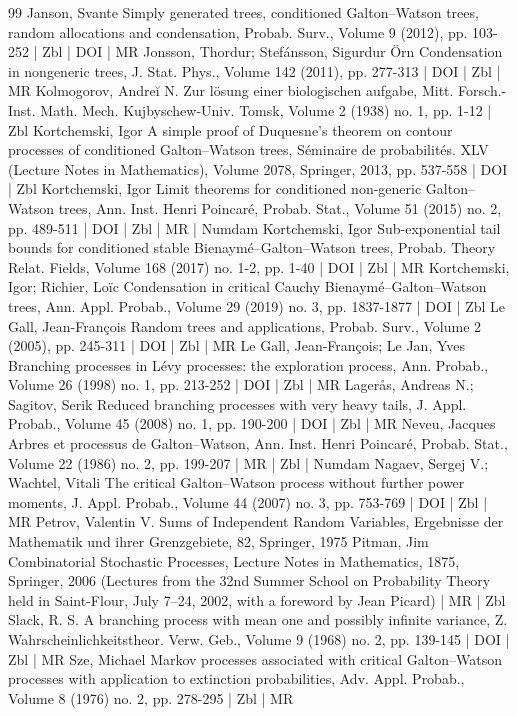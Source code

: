 \begin{thebibliography}{99}
Janson, Svante Simply generated trees, conditioned Galton–Watson trees, random allocations and condensation, Probab. Surv., Volume 9 (2012), pp. 103-252 | Zbl | DOI | MR
Jonsson, Thordur; Stefánsson, Sigurdur Örn Condensation in nongeneric trees, J. Stat. Phys., Volume 142 (2011), pp. 277-313 | DOI | Zbl | MR
Kolmogorov, Andreĭ N. Zur lösung einer biologischen aufgabe, Mitt. Forsch.-Inst. Math. Mech. Kujbyschew-Univ. Tomsk, Volume 2 (1938) no. 1, pp. 1-12 | Zbl
Kortchemski, Igor A simple proof of Duquesne’s theorem on contour processes of conditioned Galton–Watson trees, Séminaire de probabilités. XLV (Lecture Notes in Mathematics), Volume 2078, Springer, 2013, pp. 537-558 | DOI | Zbl
Kortchemski, Igor Limit theorems for conditioned non-generic Galton–Watson trees, Ann. Inst. Henri Poincaré, Probab. Stat., Volume 51 (2015) no. 2, pp. 489-511 | DOI | Zbl | MR | Numdam
Kortchemski, Igor Sub-exponential tail bounds for conditioned stable Bienaymé–Galton–Watson trees, Probab. Theory Relat. Fields, Volume 168 (2017) no. 1-2, pp. 1-40 | DOI | Zbl | MR
Kortchemski, Igor; Richier, Loïc Condensation in critical Cauchy Bienaymé–Galton–Watson trees, Ann. Appl. Probab., Volume 29 (2019) no. 3, pp. 1837-1877 | DOI | Zbl
Le Gall, Jean-François Random trees and applications, Probab. Surv., Volume 2 (2005), pp. 245-311 | DOI | Zbl | MR
Le Gall, Jean-François; Le Jan, Yves Branching processes in Lévy processes: the exploration process, Ann. Probab., Volume 26 (1998) no. 1, pp. 213-252 | DOI | Zbl | MR
Lagerås, Andreas N.; Sagitov, Serik Reduced branching processes with very heavy tails, J. Appl. Probab., Volume 45 (2008) no. 1, pp. 190-200 | DOI | Zbl | MR
Neveu, Jacques Arbres et processus de Galton–Watson, Ann. Inst. Henri Poincaré, Probab. Stat., Volume 22 (1986) no. 2, pp. 199-207 | MR | Zbl | Numdam
Nagaev, Sergej V.; Wachtel, Vitali The critical Galton–Watson process without further power moments, J. Appl. Probab., Volume 44 (2007) no. 3, pp. 753-769 | DOI | Zbl | MR
Petrov, Valentin V. Sums of Independent Random Variables, Ergebnisse der Mathematik und ihrer Grenzgebiete, 82, Springer, 1975
Pitman, Jim Combinatorial Stochastic Processes, Lecture Notes in Mathematics, 1875, Springer, 2006 (Lectures from the 32nd Summer School on Probability Theory held in Saint-Flour, July 7–24, 2002, with a foreword by Jean Picard) | MR | Zbl
Slack, R. S. A branching process with mean one and possibly infinite variance, Z. Wahrscheinlichkeitstheor. Verw. Geb., Volume 9 (1968) no. 2, pp. 139-145 | DOI | Zbl | MR
Sze, Michael Markov processes associated with critical Galton–Watson processes with application to extinction probabilities, Adv. Appl. Probab., Volume 8 (1976) no. 2, pp. 278-295 | Zbl | MR
\end{thebibliography}

